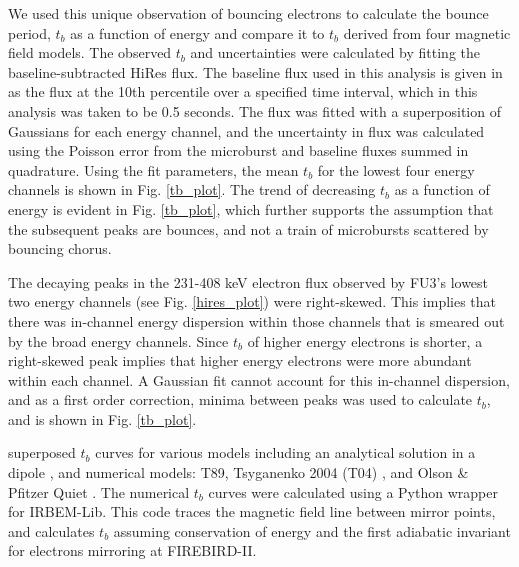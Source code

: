 \documentclass[draft, linenumbers]{agujournal}
\begin{document}
We used this unique observation of bouncing electrons to calculate the bounce period, $t_b$ as a function of energy and compare it to $t_b$ derived from four magnetic field models. The observed $t_b$ and uncertainties were calculated by fitting the baseline-subtracted HiRes flux. The baseline flux used in this analysis is given in \citet{O'Brien2004} as the flux at the 10th percentile over a specified time interval, which in this analysis was taken to be 0.5 seconds. The flux was fitted with a superposition of Gaussians for each energy channel, and the uncertainty in flux was calculated using the Poisson error from the microburst and baseline fluxes summed in quadrature. Using the fit parameters, the mean $t_b$ for the lowest four energy channels is shown in Fig. \ref{tb_plot}. The trend of decreasing $t_b$ as a function of energy is evident in Fig. \ref{tb_plot}, which further supports the assumption that the subsequent peaks are bounces, and not a train of microbursts scattered by bouncing chorus. 

The decaying peaks in the 231-408 keV electron flux observed by FU3's lowest two energy channels (see Fig. \ref{hires_plot}) were right-skewed. This implies that there was in-channel energy dispersion within those channels that is smeared out by the broad energy channels. Since $t_b$ of higher energy electrons is shorter, a right-skewed peak implies that higher energy electrons were more abundant within each channel. A Gaussian fit cannot account for this in-channel dispersion, and as a first order correction, minima between peaks was used to calculate $t_b$, and is shown in Fig. \ref{tb_plot}. 

 superposed  $t_b$ curves for various models including an analytical solution in a dipole \citep{Schulz1974}, and numerical models: T89, Tsyganenko 2004 (T04) \citep{Tsyganenko2005}, and Olson \& Pfitzer Quiet \citep{Olson1982} . The numerical $t_b$ curves were calculated using a Python wrapper for IRBEM-Lib. This code traces the magnetic field line between mirror points, and calculates $t_b$ assuming conservation of energy and the first adiabatic invariant for electrons mirroring at FIREBIRD-II.  
\end{document}
